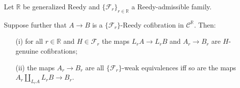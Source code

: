 \documentclass[a4paper,10pt
 ,draft
]{article}%
\begin{document}
\begin{lemma}\label{REEDYTRCOF LEM}
Let $\mathbb{R}$ be generalized Reedy and 
$\{\mathcal{F}_r\}_{r \in \mathbb{R}}$ a Reedy-admissible family.

Suppose further that $A \to B$ is a $\{\mathcal{F}_r\}$-Reedy cofibration
in $\mathcal{C}^{\mathbb{R}}$. Then:
\begin{itemize}
	\item[(i)] for all $r \in \mathbb{R}$ and $H \in \mathcal{F}_r$
	the maps $L_r A \to L_r B$ and $A_r \to B_r$ are
	$H$-genuine cofibrations;
	\item[(ii)] the maps $A_r \to B_r$ are all $\{\mathcal{F}_r\}$-weak equivalences iff so are the maps $A_r \amalg_{L_r A} L_r B \to B_r$.
\end{itemize}
\end{lemma}
\end{document}
